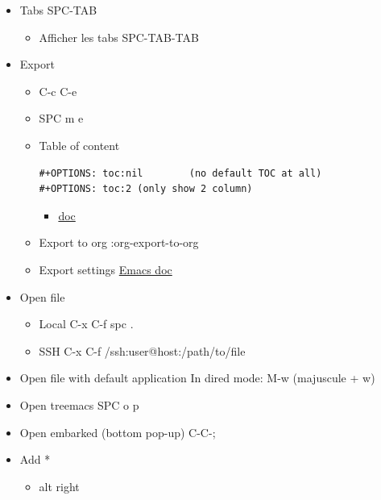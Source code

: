 \documentclass{article}
\begin{document}
\begin{itemize}
\begin{itemize}
\begin{enumerate}
\item tap on \texttt{+} and enter name of the directory
\end{enumerate}
\end{itemize}
\item Tabs
\label{sec:org76b4424}
SPC-TAB
\begin{itemize}
\item Afficher les tabs
\label{sec:org5124cf8}
SPC-TAB-TAB
\end{itemize}
\item Export
\label{sec:org76ff9e9}
\begin{itemize}
\item C-c C-e
\item SPC m e
\end{itemize}
\begin{itemize}
\item Table of content
\label{sec:org0f08205}
\begin{verbatim}
#+OPTIONS: toc:nil        (no default TOC at all)
#+OPTIONS: toc:2 (only show 2 column)
\end{verbatim}
\begin{itemize}
\item \href{https://emacsdocs.org/docs/org/Table-of-Contents}{doc}
\label{sec:orgb953360}
\end{itemize}
\item Export to org
\label{sec:org2286696}
:org-export-to-org
\item Export settings
\label{sec:org01bb9a7}
\href{https://emacsdocs.org/docs/org/Export-Settings}{Emacs doc}
\end{itemize}
\item Open file
\label{sec:org1b72b8a}
\begin{itemize}
\item Local
\label{sec:orgdc7b3a9}
C-x C-f
spc .
\item SSH
\label{sec:org66201f0}
C-x C-f
/ssh:user@host:/path/to/file
\end{itemize}
\item Open file with default application
\label{sec:org040084b}
In dired mode: M-w (majuscule + w)
\item Open treemacs
\label{sec:orgd86a4ca}
SPC o p
\item Open embarked (bottom pop-up)
\label{sec:org17281cc}
C-C-;
\item Add *
\label{sec:orgf75284b}
\begin{itemize}
\item alt right
\end{itemize}

\end{itemize}
\end{document}
